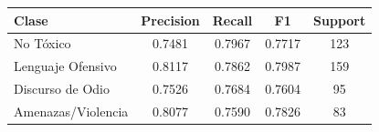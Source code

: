 \begin{tabular}{lcccc}
\toprule
Clase & Precision & Recall & F1 & Support \\
\midrule
No Tóxico & 0.7481 & 0.7967 & 0.7717 & 123 \\
Lenguaje Ofensivo & 0.8117 & 0.7862 & 0.7987 & 159 \\
Discurso de Odio & 0.7526 & 0.7684 & 0.7604 & 95 \\
Amenazas/Violencia & 0.8077 & 0.7590 & 0.7826 & 83 \\
\bottomrule
\end{tabular}
